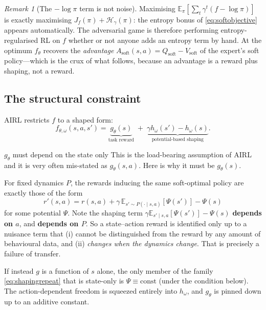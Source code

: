 \documentclass[11pt]{article}
\theoremstyle{plain}
\theoremstyle{definition}
\theoremstyle{remark}
\newtheorem{remark}[theorem]{Remark}
\newcommand{\E}{\mathbb{E}}
\newcommand{\soft}{\mathrm{soft}}
\begin{document}
\begin{remark}[The $-\log\pi$ term is not noise]
Maximising $\E_\pi[\sum_t \gamma^t(f-\log\pi)]$ is exactly maximising
$J_f(\pi) + \mathcal{H}_\gamma(\pi)$: the entropy bonus of
\eqref{eq:softobjective} appears automatically. The adversarial game is
therefore performing entropy-regularised RL on $f$ whether or not anyone
adds an entropy term by hand. At the optimum $f_\theta$ recovers the
\emph{advantage} $A_\soft(s,a) = Q_\soft - V_\soft$ of the expert's soft
policy---which is the crux of what follows, because an advantage is a
reward plus shaping, not a reward.
\end{remark}

\subsection{The structural constraint}

AIRL restricts $f$ to a shaped form:
\begin{equation}
f_{\theta,\omega}(s,a,s') = \underbrace{g_\theta(s)}_{\text{task reward}}
\;+\; \underbrace{\gamma h_\omega(s') - h_\omega(s)}_{\text{potential-based
shaping}}.
\label{eq:airlshaped}
\end{equation}

\begin{redbox}{$g_\theta$ must depend on the state only}
This is the load-bearing assumption of AIRL and it is very often
mis-stated as $g_\theta(s,a)$. Here is why it must be $g_\theta(s)$.

For fixed dynamics $P$, the rewards inducing the same soft-optimal policy
are exactly those of the form
\begin{equation}
r'(s,a) = r(s,a) + \gamma\,\E_{s'\sim P(\cdot\mid s,a)}[\Psi(s')] - \Psi(s)
\label{eq:shapingrepeat}
\end{equation}
for some potential $\Psi$. Note the shaping term $\gamma\E_{s'\mid
s,a}[\Psi(s')]-\Psi(s)$ \textbf{depends on $a$}, and \textbf{depends on
$P$}. So a state--action reward is identified only up to a nuisance term
that (i) cannot be distinguished from the reward by any amount of
behavioural data, and (ii) \emph{changes when the dynamics change}. That
is precisely a failure of transfer.

If instead $g$ is a function of $s$ alone, the only member of the family
\eqref{eq:shapingrepeat} that is state-only is $\Psi\equiv\text{const}$
(under the condition below). The action-dependent freedom is squeezed
entirely into $h_\omega$, and $g_\theta$ is pinned down up to an additive
constant.
\end{redbox}
\end{document}
